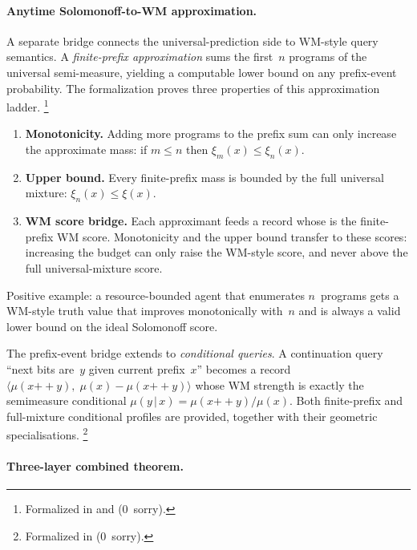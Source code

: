 \documentclass[11pt,openany]{report}
\begin{document}
\paragraph{Anytime Solomonoff-to-WM approximation.}

A separate bridge connects the universal-prediction side to WM-style query
semantics.  A \emph{finite-prefix approximation} sums the first~$n$ programs
of the universal semi-measure, yielding a computable lower bound on any
prefix-event probability.  The formalization proves three properties of this
approximation ladder.%
\footnote{Formalized in
 and
(0~sorry).}
\begin{enumerate}
\item \textbf{Monotonicity.}  Adding more programs to the prefix sum can only
  increase the approximate mass: if $m \le n$ then
  $\xi_m(x) \le \xi_n(x)$.
\item \textbf{Upper bound.}  Every finite-prefix mass is bounded by the full
  universal mixture: $\xi_n(x) \le \xi(x)$.
\item \textbf{WM score bridge.}  Each approximant feeds a
   record whose  is the finite-prefix
  WM score.  Monotonicity and the upper bound transfer to these scores:
  increasing the budget can only raise the WM-style score, and never above
  the full universal-mixture score.
\end{enumerate}
\noindent
Positive example: a resource-bounded agent that enumerates $n$~programs
gets a WM-style truth value that improves monotonically with~$n$ and is
always a valid lower bound on the ideal Solomonoff score.

The prefix-event bridge extends to \emph{conditional queries}.  A
continuation query ``next bits are~$y$ given current prefix~$x$'' becomes a
 record
$\langle\mu(x \mathbin{{+}{+}} y),\; \mu(x) - \mu(x \mathbin{{+}{+}} y)\rangle$
whose WM strength is exactly the semimeasure conditional
$\mu(y\,|\,x) = \mu(x \mathbin{{+}{+}} y) / \mu(x)$.  Both finite-prefix
and full-mixture conditional profiles are provided, together with their
geometric specialisations.%
\footnote{Formalized in
(0~sorry).}

\paragraph{Three-layer combined theorem.}
\end{document}
